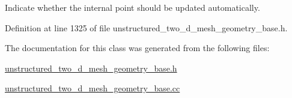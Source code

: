 Indicate whether the internal point should be updated automatically. 



Definition at line 1325 of file unstructured\+\_\+two\+\_\+d\+\_\+mesh\+\_\+geometry\+\_\+base.\+h.



The documentation for this class was generated from the following files\+:\begin{DoxyCompactItemize}
\item 
\hyperlink{unstructured__two__d__mesh__geometry__base_8h}{unstructured\+\_\+two\+\_\+d\+\_\+mesh\+\_\+geometry\+\_\+base.\+h}\item 
\hyperlink{unstructured__two__d__mesh__geometry__base_8cc}{unstructured\+\_\+two\+\_\+d\+\_\+mesh\+\_\+geometry\+\_\+base.\+cc}\end{DoxyCompactItemize}
